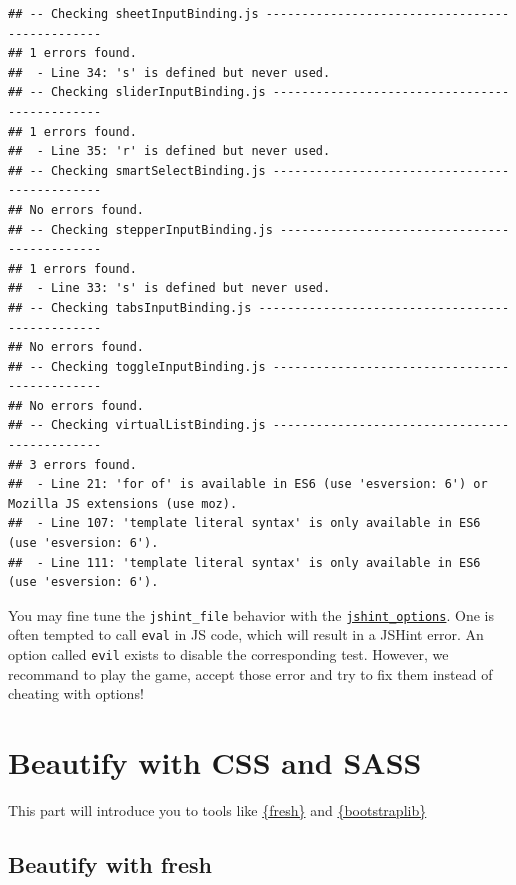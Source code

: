 \documentclass[]{book}
\begin{document}
\begin{verbatim}
## -- Checking sheetInputBinding.js ----------------------------------------------- 
## 1 errors found. 
##  - Line 34: 's' is defined but never used. 
## -- Checking sliderInputBinding.js ---------------------------------------------- 
## 1 errors found. 
##  - Line 35: 'r' is defined but never used. 
## -- Checking smartSelectBinding.js ---------------------------------------------- 
## No errors found. 
## -- Checking stepperInputBinding.js --------------------------------------------- 
## 1 errors found. 
##  - Line 33: 's' is defined but never used. 
## -- Checking tabsInputBinding.js ------------------------------------------------ 
## No errors found. 
## -- Checking toggleInputBinding.js ---------------------------------------------- 
## No errors found. 
## -- Checking virtualListBinding.js ---------------------------------------------- 
## 3 errors found. 
##  - Line 21: 'for of' is available in ES6 (use 'esversion: 6') or Mozilla JS extensions (use moz). 
##  - Line 107: 'template literal syntax' is only available in ES6 (use 'esversion: 6'). 
##  - Line 111: 'template literal syntax' is only available in ES6 (use 'esversion: 6').
\end{verbatim}

You may fine tune the \texttt{jshint\_file} behavior with the \href{https://jshint.com/docs/options/}{\texttt{jshint\_options}}. One is often tempted to call \texttt{eval} in JS code, which will result in a JSHint error. An option called \texttt{evil} exists to disable the corresponding test. However, we recommand to play the game, accept those error and try to fix them instead of cheating with options!

\hypertarget{part-beautify-with-css-and-sass}{%
\part*{Beautify with CSS and SASS}\label{part-beautify-with-css-and-sass}}

This part will introduce you to tools like \href{https://dreamrs.github.io/fresh/index.html}{\{fresh\}} and \href{https://rstudio.github.io/bootstraplib/index.html}{\{bootstraplib\}}

\hypertarget{beautify-with-fresh}{%
\chapter{Beautify with fresh}\label{beautify-with-fresh}}
\end{document}
